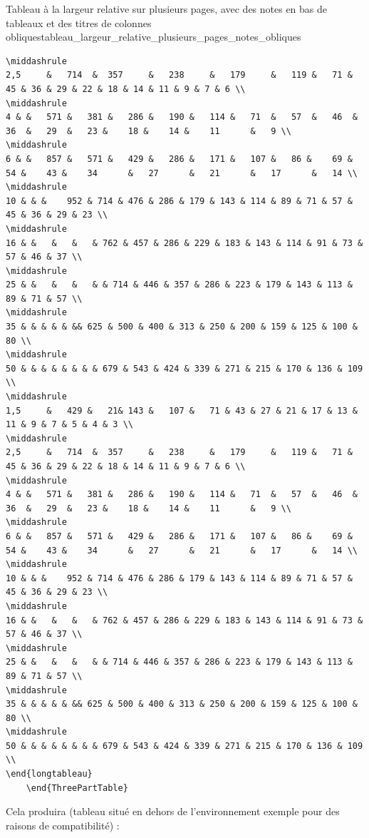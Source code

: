 \documentclass[a4paper, 11pt, twoside, fleqn]{memoir}
\begin{document}
\begin{exemple}{Tableau à la largeur relative sur plusieurs pages, avec des notes en bas de tableaux et des titres de colonnes obliques}{tableau_largeur_relative_plusieurs_pages_notes_obliques}
\begin{verbatim}
\middashrule
2,5		&	714	 &	357		&	238		&	179		&	119	&	71 & 45 & 36 & 29 &	22 & 18 & 14 & 11 &	9 &	7 & 6 \\
\middashrule
4 & &	571 &	381 &	286 &	190	&	114	&	71	&	57	&	46	&	36	&	29	&	23 &	18 &	14 &	11		&	9 \\
\middashrule
6 & &	857 &	571 &	429 &	286	&	171	&	107	&	86 &	69 &	54 &	43 &	34		&	27		&	21		&	17		&	14 \\
\middashrule
10 & & &	952 & 714 & 476 & 286 & 179 & 143 & 114 & 89 & 71 & 57 & 45 & 36 & 29 & 23 \\
\middashrule
16 & &	 &	 &	 & 762 & 457 & 286 & 229 & 183 & 143 & 114 & 91 & 73 & 57 & 46 & 37 \\
\middashrule
25 & &	 &	 &	 & & 714 & 446 & 357 & 286 & 223 & 179 & 143 & 113 & 89 & 71 & 57 \\
\middashrule
35 & & & & & && 625 & 500 & 400 & 313 & 250 & 200 & 159 & 125 & 100 & 80 \\
\middashrule
50 & & & & & & & & 679 & 543 & 424 & 339 & 271 & 215 & 170 & 136 & 109 \\
\middashrule
1,5		&	429 &	21&	143 &	107 &	71 & 43 & 27 & 21 & 17 & 13 & 11 & 9 & 7 & 5 & 4 & 3 \\
\middashrule
2,5		&	714	 &	357		&	238		&	179		&	119	&	71 & 45 & 36 & 29 &	22 & 18 & 14 & 11 &	9 &	7 & 6 \\
\middashrule
4 & &	571 &	381 &	286 &	190	&	114	&	71	&	57	&	46	&	36	&	29	&	23 &	18 &	14 &	11		&	9 \\
\middashrule
6 & &	857 &	571 &	429 &	286	&	171	&	107	&	86 &	69 &	54 &	43 &	34		&	27		&	21		&	17		&	14 \\
\middashrule
10 & & &	952 & 714 & 476 & 286 & 179 & 143 & 114 & 89 & 71 & 57 & 45 & 36 & 29 & 23 \\
\middashrule
16 & &	 &	 &	 & 762 & 457 & 286 & 229 & 183 & 143 & 114 & 91 & 73 & 57 & 46 & 37 \\
\middashrule
25 & &	 &	 &	 & & 714 & 446 & 357 & 286 & 223 & 179 & 143 & 113 & 89 & 71 & 57 \\
\middashrule
35 & & & & & && 625 & 500 & 400 & 313 & 250 & 200 & 159 & 125 & 100 & 80 \\
\middashrule
50 & & & & & & & & 679 & 543 & 424 & 339 & 271 & 215 & 170 & 136 & 109 \\
\end{longtableau}
    \end{ThreePartTable}
\end{verbatim}

Cela produira (tableau situé en dehors de l'environnement exemple pour des raisons de compatibilité) :\\


\end{exemple}
\end{document}
